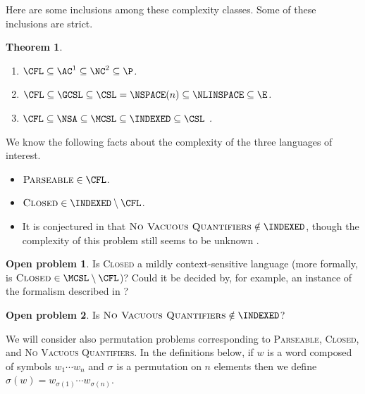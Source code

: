 \documentclass{article}
\newtheorem{theorem}{Theorem}
\theoremstyle{remark} \newtheorem{technicality}{Technical note}
\theoremstyle{definition} \newtheorem{definition}{Definition}
\theoremstyle{definition} \newtheorem{openproblem}{Open problem}
\newcommand{\pair}[2]{\langle#1,#2\rangle} %
\newcommand{\lb}{\left\{} %
\newcommand{\rb}{\right\}} %
\newcommand{\st}{\,\middle|\,} %
\newcommand{\CLOSED}{\textsc{Closed}}
\newcommand{\PARSEABLE}{\textsc{Parseable}}
\newcommand{\NVQ}{\textsc{No Vacuous Quantifiers}}
\begin{document}
Here are some inclusions among these complexity classes.
Some of these inclusions are strict.
\begin{theorem}\mbox{}
  \begin{enumerate}
  \item $\CFL\subseteq\AC^1\subseteq\NC^2\subseteq\P$.
  \item $\CFL\subseteq\GCSL\subseteq\CSL=\NSPACE(n)\subseteq\NLINSPACE\subseteq\E$.
  \item $\CFL\subseteq\NSA\subseteq\MCSL\subseteq\INDEXED\subseteq\CSL$ \cite{hu79}.
  \end{enumerate}
\end{theorem}

We know the following facts about the complexity of the three languages of interest.
\begin{itemize}
\item $\PARSEABLE \in \CFL$.
\item $\CLOSED \in \INDEXED \setminus \CFL$. \cite{mp84}
\item It is conjectured in \cite{mp84} that $\NVQ \notin \INDEXED$, though the complexity of this problem still seems to be unknown \cite{potts}.
\end{itemize}


\begin{openproblem}
  Is \CLOSED{} a mildly context-sensitive language (more formally, is $\CLOSED \in \MCSL \setminus \CFL$)? Could it be decided by, for example, an instance of the formalism described in \cite{kallmeyer}?
\end{openproblem}

\begin{openproblem}
  Is $\NVQ \notin \INDEXED$?
\end{openproblem}

We will consider also permutation problems corresponding to \PARSEABLE, \CLOSED, and \NVQ.
In the definitions below, if $w$ is a word composed of symbols $w_1 \dotsb w_n$ and $\sigma$ is a permutation on $n$ elements then we define $\sigma(w) = w_{\sigma(1)} \dotsb w_{\sigma(n)}$.
\end{document}
